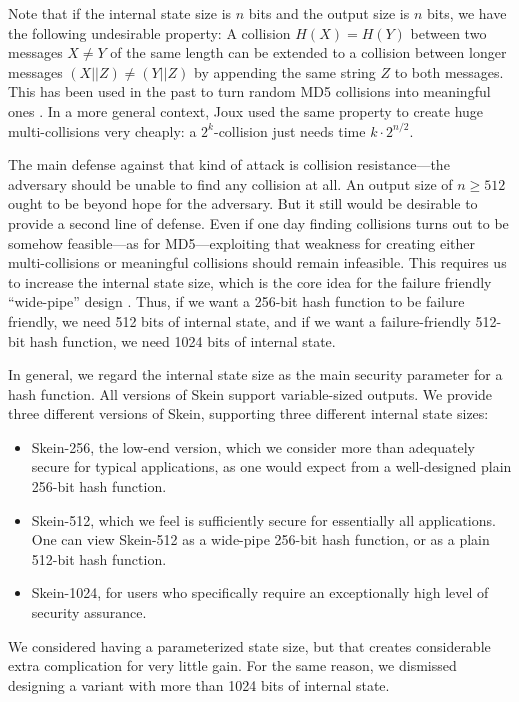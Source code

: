 \documentclass[11pt,twoside]{article}
\begin{document}
Note that if the internal state size is $n$ bits and the output size is $n$ bits, we have the following undesirable property: A collision $H(X)=H(Y)$ between two messages $X \neq Y$ of the same length can be extended to a collision between longer messages $(X||Z) \neq (Y||Z)$ by appending the same string $Z$ to both messages. This has been used in the past to turn random MD5 collisions into meaningful ones \cite{K04,DL05,M04b,LW05,GIS06,SLW07}. In a more general context, Joux \cite{J04} used the same property to create huge multi-collisions very cheaply: a $2^k$-collision just needs time $k \cdot 2^{n/2}$.

The main defense against that kind of attack is collision resistance---the adversary should be unable to find any collision at all. An output size of $n \ge 512$ ought to be beyond hope for the adversary. But it still would be desirable to provide a second line of defense. Even if one day finding collisions turns out to be somehow feasible---as for MD5---exploiting that weakness for creating either multi-collisions or meaningful collisions should remain infeasible. This requires us to increase the internal state size, which is the core idea for the failure friendly ``wide-pipe'' design \cite{L04}. Thus, if we want a 256-bit hash function to be failure friendly, we need 512 bits of internal state, and if we want a failure-friendly 512-bit hash function, we need 1024 bits of internal state.

In general, we regard the internal state size as the main security parameter for a hash function. All versions of Skein support variable-sized outputs.  We provide three different versions of Skein, supporting three different internal state sizes:
\begin{itemize}
\item Skein-256, the low-end version, which we consider more than adequately secure for typical applications, as one would expect from a well-designed plain  256-bit hash function.
\item Skein-512, which we feel is sufficiently secure for essentially all applications.  One can view Skein-512 as a wide-pipe 256-bit hash function, or as a plain 512-bit hash function.
\item Skein-1024, for users who specifically require an exceptionally high level of security assurance.
\end{itemize}

We considered having a parameterized state size, but that creates considerable extra complication for very little gain. For the same reason, we dismissed designing a variant with more than 1024 bits of internal state.
\end{document}
